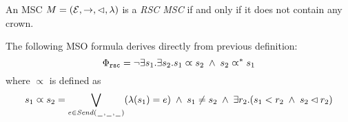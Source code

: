 \begin{definition} \label{def:rsc_alt}
	An MSC $M = (\mathcal{E},\to,\lhd,\lambda)$ is a \emph{RSC MSC} if and only if it does not contain any crown.
\end{definition}


The following MSO formula derives directly from previous  definition:
\[\Phi_{\mathtt{rsc}} = \neg \exists s_1.\exists s_2. s_1 \varpropto s_2 \;\wedge\; s_2 \varpropto^\ast s_1
\]
\noindent where $\varpropto$ is defined as
\[
s_1 \varpropto s_2 = 
\bigvee_{\substack{e \in {\mathit{Send}(\hspace{0.1em}\underline{\hspace{0.5em}}\hspace{0.1em},\hspace{0.1em}\underline{\hspace{0.5em}}\hspace{0.1em},\hspace{0.1em}\underline{\hspace{0.5em}}\hspace{0.1em})}}}(\lambda(s_1) = e) \;\wedge\;
s_1 \neq s_2 \;\wedge\; 
\exists r_2. (s_1 < r_2 \;\wedge\; s_2 \lhd r_2)
\]



